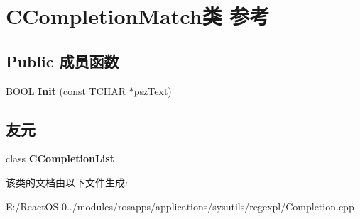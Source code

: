 \hypertarget{class_c_completion_match}{}\section{C\+Completion\+Match类 参考}
\label{class_c_completion_match}
\subsection*{Public 成员函数}
\begin{DoxyCompactItemize}
\item 
\mbox{\label{class_c_completion_match_a9866b2a8359b3f5c11ae7ee05476bdc6}} 
B\+O\+OL {\bfseries Init} (const T\+C\+H\+AR $\ast$psz\+Text)
\end{DoxyCompactItemize}
\subsection*{友元}
\begin{DoxyCompactItemize}
\item 
\mbox{\label{class_c_completion_match_add358f525263b61f75c3ee584a7eab74}} 
class {\bfseries C\+Completion\+List}
\end{DoxyCompactItemize}


该类的文档由以下文件生成\+:\begin{DoxyCompactItemize}
\item 
E\+:/\+React\+O\+S-\/0../modules/rosapps/applications/sysutils/regexpl/Completion.\+cpp\end{DoxyCompactItemize}
